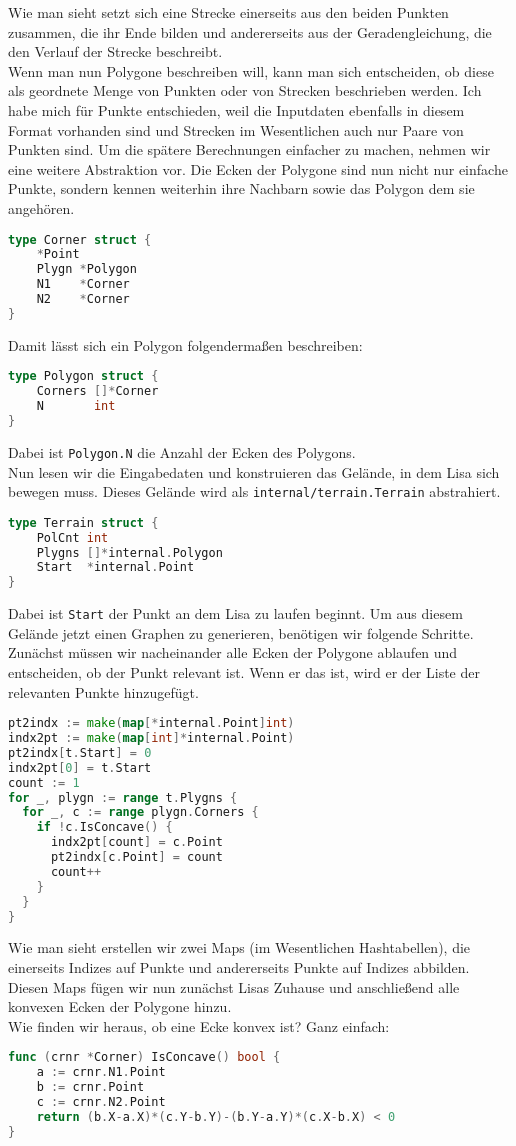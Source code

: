 \documentclass[a4paper,10pt,ngerman]{scrartcl}
\begin{document}
Wie man sieht setzt sich eine Strecke einerseits aus den beiden Punkten zusammen, die ihr Ende bilden und andererseits aus der Geradengleichung, die den Verlauf der Strecke beschreibt.\\
Wenn man nun Polygone beschreiben will, kann man sich entscheiden, ob diese als geordnete Menge von Punkten oder von Strecken beschrieben werden. Ich habe mich für Punkte entschieden, weil die Inputdaten ebenfalls in diesem Format vorhanden sind und Strecken im Wesentlichen auch nur Paare von Punkten sind. Um die spätere Berechnungen einfacher zu machen, nehmen wir eine weitere Abstraktion vor. Die Ecken der Polygone sind nun nicht nur einfache Punkte, sondern kennen weiterhin ihre Nachbarn sowie das Polygon dem sie angehören.
\begin{lstlisting}[language=go]
type Corner struct {
	*Point
	Plygn *Polygon
	N1    *Corner
	N2    *Corner
} 
\end{lstlisting}
Damit lässt sich ein Polygon folgenderma\ss en beschreiben:
\begin{lstlisting}[language=go]
type Polygon struct {
	Corners []*Corner
	N       int
}
\end{lstlisting}
Dabei ist \texttt{Polygon.N} die Anzahl der Ecken des Polygons.\\
Nun lesen wir die Eingabedaten und konstruieren das Gelände, in dem Lisa sich bewegen muss. Dieses Gelände wird als \texttt{internal/terrain.Terrain} abstrahiert.
\begin{lstlisting}[language=go]
type Terrain struct {
	PolCnt int
	Plygns []*internal.Polygon
	Start  *internal.Point
}
\end{lstlisting}
Dabei ist \texttt{Start} der Punkt an dem Lisa zu laufen beginnt. Um aus diesem Gelände jetzt einen Graphen zu generieren, benötigen wir folgende Schritte.\\
Zunächst müssen wir nacheinander alle Ecken der Polygone ablaufen und entscheiden, ob der Punkt relevant ist. Wenn er das ist, wird er der Liste der relevanten Punkte hinzugefügt. 
\begin{lstlisting}[language=go]
pt2indx := make(map[*internal.Point]int)
indx2pt := make(map[int]*internal.Point)
pt2indx[t.Start] = 0
indx2pt[0] = t.Start
count := 1
for _, plygn := range t.Plygns {
  for _, c := range plygn.Corners {
    if !c.IsConcave() {
      indx2pt[count] = c.Point
      pt2indx[c.Point] = count
      count++
    }
  }
}
\end{lstlisting}
Wie man sieht erstellen wir zwei Maps (im Wesentlichen Hashtabellen), die einerseits Indizes auf Punkte und andererseits Punkte auf Indizes abbilden. Diesen Maps fügen wir nun zunächst Lisas Zuhause und anschließend alle konvexen Ecken der Polygone hinzu.\\
Wie finden wir heraus, ob eine Ecke konvex ist? Ganz einfach:
\begin{lstlisting}[language=go]
func (crnr *Corner) IsConcave() bool {
	a := crnr.N1.Point
	b := crnr.Point
	c := crnr.N2.Point
	return (b.X-a.X)*(c.Y-b.Y)-(b.Y-a.Y)*(c.X-b.X) < 0
}
\end{lstlisting}
\end{document}
